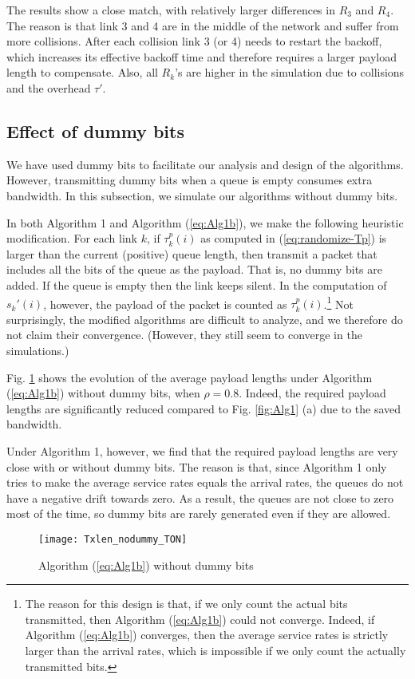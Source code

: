 \documentclass{IEEEtran}
\begin{document}
The results show a close match, with relatively larger differences
in $R_{3}$ and $R_{4}$. The reason is that link 3 and 4 are in the
middle of the network and suffer from more collisions. After each
collision link 3 (or 4) needs to restart the backoff, which increases
its effective backoff time and therefore requires a larger payload
length to compensate. Also, all $R_{k}$'s are higher in the simulation
due to collisions and the overhead $\tau'$.


\subsection{\label{sub:dummy_bits}Effect of dummy bits}

We have used dummy bits to facilitate our analysis and design of the
algorithms. However, transmitting dummy bits when a queue is empty
consumes extra bandwidth. In this subsection, we simulate our algorithms
without dummy bits.

In both Algorithm 1 and Algorithm (\ref{eq:Alg1b}), we make the following
heuristic modification. For each link $k$, if $\tau_{k}^{p}(i)$
as computed in (\ref{eq:randomize-Tp}) is larger than the current
(positive) queue length, then transmit a packet that includes all
the bits of the queue as the payload. That is, no dummy bits are added.
If the queue is empty then the link keeps silent. In the computation
of $s_{k}'(i)$, however, the payload of the packet is counted as
$\tau_{k}^{p}(i)$.\footnote{The reason for this design is that, if we only count the actual bits
transmitted, then Algorithm (\ref{eq:Alg1b}) could not converge.
Indeed, if Algorithm (\ref{eq:Alg1b}) converges, then the average
service rates is strictly larger than the arrival rates, which is
impossible if we only count the actually transmitted bits.} Not surprisingly, the modified algorithms are difficult to analyze,
and we therefore do not claim their convergence. (However, they still
seem to converge in the simulations.)

Fig. \ref{fig:nodummypkt} shows the evolution of the average payload
lengths under Algorithm (\ref{eq:Alg1b}) without dummy bits, when
$\rho=0.8$. Indeed, the required payload lengths are significantly
reduced compared to Fig. \ref{fig:Alg1} (a) due to the saved bandwidth. 

Under Algorithm 1, however, we find that the required payload lengths
are very close with or without dummy bits. The reason is that, since
Algorithm 1 only tries to make the average service rates equals the
arrival rates, the queues do not have a negative drift towards zero.
As a result, the queues are not close to zero most of the time, so
dummy bits are rarely generated even if they are allowed. \begin{figure}
\begin{centering}
\texttt{[image: Txlen\_nodummy\_TON]}
\par\end{centering}

\caption{\label{fig:nodummypkt}Algorithm (\ref{eq:Alg1b}) without dummy bits}



\end{figure}
\end{document}
